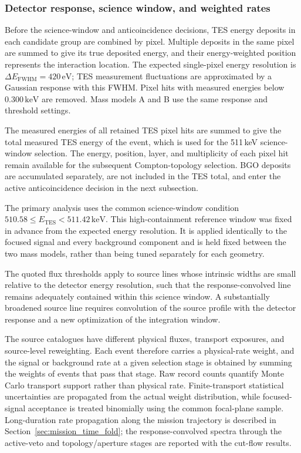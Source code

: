 \documentclass[11pt]{article}
\newcommand{\keV}{\ensuremath{\,\mathrm{keV}}}
\begin{document}
\subsubsection{Detector response, science window, and weighted rates}
\label{subsec:detector_response}

Before the science-window and anticoincidence decisions, TES energy deposits in
each candidate group are combined by pixel. Multiple deposits in the same pixel
are summed to give its true deposited energy, and their energy-weighted position
represents the interaction location. The expected single-pixel energy resolution
is $\Delta E_{\mathrm{FWHM}}=420\,\mathrm{eV}$; TES measurement fluctuations are
approximated by a Gaussian response with this FWHM. Pixel hits with measured
energies below $0.300\keV$ are removed. Mass models A and B use the same response
and threshold settings.

The measured energies of all retained TES pixel hits are summed to give the total
measured TES energy of the event, which is used for the 511\,keV science-window
selection. The energy, position, layer, and multiplicity of each pixel hit remain
available for the subsequent Compton-topology selection. BGO deposits are
accumulated separately, are not included in the TES total, and enter the active
anticoincidence decision in the next subsection.

The primary analysis uses the common science-window condition
$510.58\leq E_{\mathrm{TES}}<511.42\keV$. This
high-containment reference window was fixed in advance from the expected energy
resolution. It is applied identically to the focused signal and every background
component and is held fixed between the two mass models, rather than being tuned
separately for each geometry.

The quoted flux thresholds apply to source lines whose intrinsic widths are
small relative to the detector energy resolution, such that the
response-convolved line remains adequately contained within this science
window. A substantially broadened source line requires convolution of the
source profile with the detector response and a new optimization of the
integration window.

The source catalogues have different physical fluxes, transport exposures, and
source-level reweighting. Each event therefore carries a physical-rate weight,
and the signal or background rate at a given selection stage is obtained by
summing the weights of events that pass that stage. Raw record counts quantify
Monte Carlo transport support rather than physical rate. Finite-transport
statistical uncertainties are propagated from the actual weight distribution,
while focused-signal acceptance is treated binomially using the common focal-plane
sample. Long-duration rate propagation along the mission trajectory is described
in Section~\ref{sec:mission_time_fold}; the response-convolved spectra through
the active-veto and topology/aperture stages are reported with the cut-flow results.
\end{document}
